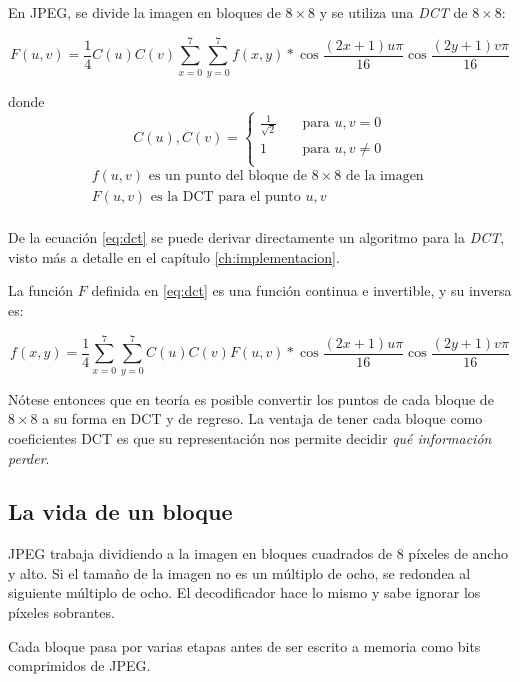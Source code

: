 En JPEG, se divide la imagen en bloques de $8\times8$ y se utiliza una
\emph{DCT} de $8\times8$:

\begin{equation}\label{eq:dct}
F(u, v) = \frac{1}{4} C(u)C(v) \sum_{x=0}^{7}\sum_{y=0}^{7}
f(x,y)*\cos{\frac{(2x+1)u\pi}{16}}\cos{\frac{(2y+1)v\pi}{16}}
\end{equation}

donde \[C(u), C(v) = \begin{cases}
        \frac{1}{\sqrt{2}} & \quad \text{para } u,v = 0\\
        1                  & \quad \text{para } u,v \neq 0\\
\end{cases} \]
\begin{eqnarray*}
    f(u, v) \text{ es un punto del bloque de } 8\times8 \text{ de la imagen }\\
    F(u, v) \text{ es la DCT para el punto } u,v\\
\end{eqnarray*}

De la ecuación \ref{eq:dct} se puede derivar directamente un algoritmo para la
\emph{DCT}, visto más a detalle en el capítulo \ref{ch:implementacion}.

La función $F$ definida en \ref{eq:dct} es una función continua e invertible, y
su inversa es:

\begin{equation}\label{eq:idct}
f(x, y) = \frac{1}{4} \sum_{x=0}^{7}\sum_{y=0}^{7} C(u)C(v) F(u, v)*
\cos{\frac{(2x+1)u\pi}{16}}\cos{\frac{(2y+1)v\pi}{16}}
\end{equation}

Nótese entonces que en teoría es posible convertir los puntos de cada bloque de
$8\times8$ a su forma en DCT y de regreso. La ventaja de tener cada bloque como
coeficientes DCT es que su representación nos permite decidir \emph{qué
información perder}.

\subsection{La vida de un bloque}\label{sub:vida}


JPEG trabaja dividiendo a la imagen en bloques cuadrados de 8 píxeles de ancho
y alto. Si el tamaño de la imagen no es un múltiplo de ocho, se redondea al
siguiente múltiplo de ocho. El decodificador hace lo mismo y sabe ignorar los
píxeles sobrantes.

Cada bloque pasa por varias etapas antes de ser escrito a memoria como bits
comprimidos de JPEG.


